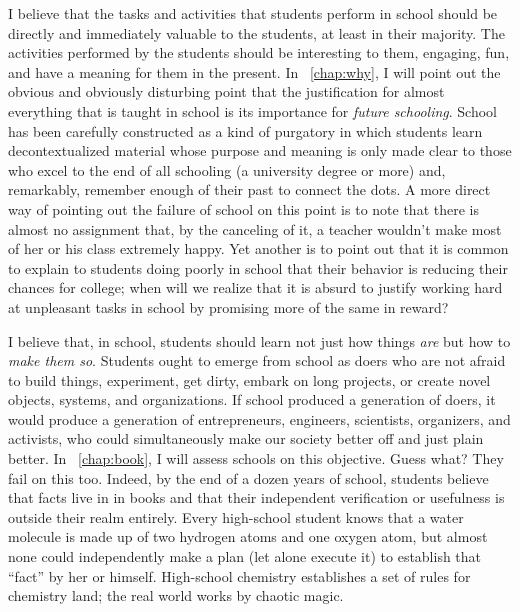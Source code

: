 \documentclass[11pt]{book}
\begin{document}
I believe that the tasks and activities that students perform in
school should be directly and immediately valuable to the students, at
least in their majority.  The activities performed by the students
should be interesting to them, engaging, fun, and have a meaning for
them in the present.  In \chaptername~\ref{chap:why}, I will point out
the obvious and obviously disturbing point that the justification for
almost everything that is taught in school is its importance for
\emph{future schooling}.  School has been carefully constructed as a
kind of purgatory in which students learn decontextualized material
whose purpose and meaning is only made clear to those who excel to the
end of all schooling (a university degree or more) and, remarkably,
remember enough of their past to connect the dots.  A more direct way
of pointing out the failure of school on this point is to note that
there is almost no assignment that, by the canceling of it, a teacher
wouldn't make most of her or his class extremely happy.  Yet another
is to point out that it is common to explain to students doing poorly
in school that their behavior is reducing their chances for college;
when will we realize that it is absurd to justify working hard at
unpleasant tasks in school by promising more of the same in reward?

I believe that, in school, students should learn not just how things
\emph{are} but how to \emph{make them so}.  Students ought to emerge
from school as doers who are not afraid to build things, experiment,
get dirty, embark on long projects, or create novel objects, systems,
and organizations.  If school produced a generation of doers, it would
produce a generation of entrepreneurs, engineers, scientists,
organizers, and activists, who could simultaneously make our society
better off and just plain better.  In \chaptername~\ref{chap:book}, I
will assess schools on this objective.  Guess what?  They fail on this
too.  Indeed, by the end of a dozen years of school, students believe
that facts live in in books and that their independent verification or
usefulness is outside their realm entirely.  Every high-school student
knows that a water molecule is made up of two hydrogen atoms and one
oxygen atom, but almost none could independently make a plan (let
alone execute it) to establish that ``fact'' by her or himself.
High-school chemistry establishes a set of rules for chemistry land;
the real world works by chaotic magic.
\end{document}
